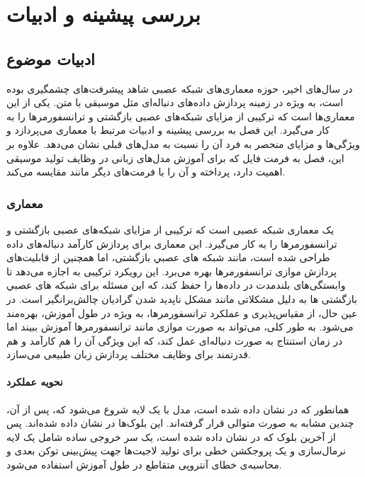 
\chapter{بررسی پیشینه و ادبیات}
\section{ادبیات موضوع}

در سال‌های اخیر، حوزه معماری‌های شبکه عصبی شاهد پیشرفت‌های چشمگیری بوده است، به ویژه در زمینه پردازش داده‌های دنباله‌ای مثل موسیقی با متن. یکی از این معماری‌ها  است که ترکیبی از مزایای شبکه‌های عصبی بازگشتی و ترانسفورمرها را به کار می‌گیرد. این فصل به بررسی پیشینه و ادبیات مرتبط با معماری  می‌پردازد و ویژگی‌ها و مزایای منحصر به فرد آن را نسبت به مدل‌های قبلی نشان می‌دهد. علاوه بر این، فصل به فرمت فایل  که برای آموزش مدل‌های زبانی در وظایف تولید موسیقی اهمیت دارد، پرداخته و آن را با فرمت‌های دیگر مانند  مقایسه می‌کند.
\subsection{معماری }

  \cite{RWKV} \cite{peng2024eagle} یک معماری شبکه عصبی است که ترکیبی از مزایای شبکه‌های عصبی بازگشتی  \cite{1808.03314} و ترانسفورمرها  \cite{1706.03762} را به کار می‌گیرد. این معماری برای پردازش کارآمد دنباله‌های داده طراحی شده است، مانند ﺷﺒﻜﻪ ﻫﺎی ﻋﺼﺒﻲ ﺑﺎﺯگشتی، اما همچنین از قابلیت‌های پردازش موازی ترانسفورمرها بهره می‌برد. این رویکرد ترکیبی به  اجازه می‌دهد تا وابستگی‌های بلندمدت در داده‌ها را حفظ کند، که این مسئله برای ﺷﺒﻜﻪ ﻫﺎی ﻋﺼﺒﻲ ﺑﺎﺯگشتی ها به دلیل مشکلاتی مانند مشکل ناپدید شدن گرادیان چالش‌برانگیز است. در عین حال، از مقیاس‌پذیری و عملکرد ترانسفورمرها، به ویژه در طول آموزش، بهره‌مند می‌شود. به طور کلی،  می‌تواند به صورت موازی مانند ترانسفورمرها آموزش ببیند اما در زمان استنتاج  به صورت دنباله‌ای عمل کند، که این ویژگی آن را هم کارآمد و هم قدرتمند برای وظایف مختلف پردازش زبان طبیعی می‌سازد.


\subsubsection{نحویه عملکرد } \label{sec:rwkvWorks}

همانطور که در  نشان داده شده است،
مدل با یک لایه  شروع می‌شود که، پس از آن، چندین   مشابه به صورت متوالی قرار گرفته‌اند. این بلوک‌ها در  نشان داده شده‌اند. پس از آخرین بلوک که در  نشان داده شده است، یک سر خروجی ساده شامل یک لایه نرمال‌سازی  و یک پروجکشن خطی برای تولید لاجیت‌ها  جهت پیش‌بینی توکن بعدی و محاسبه‌ی خطای آنتروپی متقاطع  در طول آموزش استفاده می‌شود.

